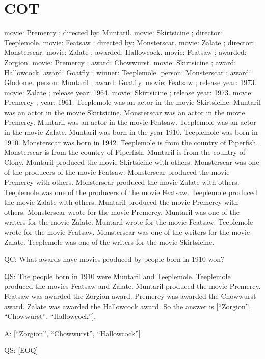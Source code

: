 \documentclass[
]{article}
\begin{document}
\section{COT}\label{cot-2}

movie: Premercy ; directed by: Muntaril. movie: Skirtsicine ; director:
Teeplemole. movie: Featsaw ; directed by: Monsterscar. movie: Zalate ;
director: Monsterscar. movie: Zalate ; awarded: Hallowcock. movie:
Featsaw ; awarded: Zorgion. movie: Premercy ; award: Chowwurst. movie:
Skirtsicine ; award: Hallowcock. award: Goatfly ; winner: Teeplemole.
person: Monsterscar ; award: Glodome. person: Muntaril ; award: Goatfly.
movie: Featsaw ; release year: 1973. movie: Zalate ; release year: 1964.
movie: Skirtsicine ; release year: 1973. movie: Premercy ; year: 1961.
Teeplemole was an actor in the movie Skirtsicine. Muntaril was an actor
in the movie Skirtsicine. Monsterscar was an actor in the movie
Premercy. Muntaril was an actor in the movie Featsaw. Teeplemole was an
actor in the movie Zalate. Muntaril was born in the year 1910.
Teeplemole was born in 1910. Monsterscar was born in 1942. Teeplemole is
from the country of Piperfish. Monsterscar is from the country of
Piperfish. Muntaril is from the country of Clony. Muntaril produced the
movie Skirtsicine with others. Monsterscar was one of the producers of
the movie Featsaw. Monsterscar produced the movie Premercy with others.
Monsterscar produced the movie Zalate with others. Teeplemole was one of
the producers of the movie Featsaw. Teeplemole produced the movie Zalate
with others. Muntaril produced the movie Premercy with others.
Monsterscar wrote for the movie Premercy. Muntaril was one of the
writers for the movie Zalate. Muntaril wrote for the movie Featsaw.
Teeplemole wrote for the movie Featsaw. Monsterscar was one of the
writers for the movie Zalate. Teeplemole was one of the writers for the
movie Skirtsicine.

QC: What awards have movies produced by people born in 1910 won?

QS: The people born in 1910 were Muntaril and Teeplemole. Teeplemole
produced the movies Featsaw and Zalate. Muntaril produced the movie
Premercy. Featsaw was awarded the Zorgion award. Premercy was awarded
the Chowwurst award. Zalate was awarded the Hallowcock award. So the
answer is {[}``Zorgion'', ``Chowwurst'', ``Hallowcock''{]}.

A: {[}``Zorgion'', ``Chowwurst'', ``Hallowcock''{]}

QS: {[}EOQ{]}
\end{document}
